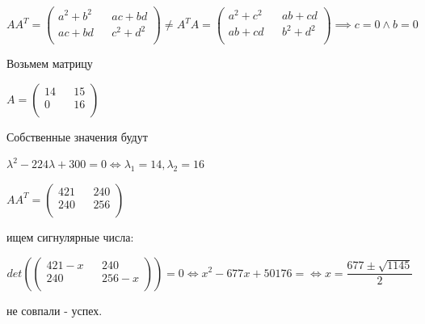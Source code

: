 \documentclass[a4paper, 11pt]{article}
\begin{document}
\begin{enumerate}
\begin{enumerate}
			$A A^T = \begin{pmatrix}
				a^2 + b^2 && ac + bd \\
				ac + bd && c^2 + d^2 \\
			\end{pmatrix} \neq A^T A = \begin{pmatrix}
				a^2 + c^2 && ab + cd \\
				ab + cd && b^2 + d^2 \\
			\end{pmatrix}  \implies c = 0 \wedge b = 0$
		
			Возьмем матрицу
			
			$A = \begin{pmatrix}
				14 && 15 \\
				0 && 16 \\
			\end{pmatrix}$
		
			Собственные значения будут
			
			$\lambda^2 - 224\lambda + 300 = 0 \Longleftrightarrow \lambda_1 = 14, \lambda_2 = 16$
		
			$A A^T = \begin{pmatrix}
				421 && 240 \\
				240 && 256 \\
			\end{pmatrix}$
			
			ищем сигнулярные числа:
			
			$$det(\begin{pmatrix}
				421 - x && 240 \\
				240 && 256 -x \\
			\end{pmatrix}) = 0 \Longleftrightarrow x^2 - 677x + 50176 = \Longleftrightarrow x = \frac{677 \pm \sqrt{1145}}{2}$$
		
			не совпали - успех.
			
				
		\end{enumerate}
	\end{enumerate}
	
\end{document}

